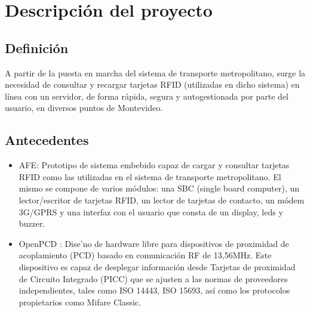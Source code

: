 \chapter{Descripci\'on del proyecto}

\section{Definici\'on}

A partir de la puesta en marcha del sistema de transporte metropolitano, surge la necesidad de consultar y recargar tarjetas RFID (utilizadas en dicho sistema) en l\'inea con un servidor, de forma r\'apida, segura y autogestionada por parte del usuario, en diversos puntos de Montevideo.

\section{Antecedentes}

\begin{itemize}

\item AFE: Prototipo de sistema embebido capaz de cargar y consultar tarjetas RFID como las utilizadas en el sistema de transporte metropolitano. El mismo se compone de varios m\'odulos: una SBC (single board computer), un lector/escritor de tarjetas RFID, un lector de tarjetas de contacto, un m\'odem 3G/GPRS y una interfaz con el usuario que consta de un display, leds y buzzer.

\item OpenPCD \cite{OpenPCD}: Dise'no de hardware libre para dispositivos de proximidad de acoplamiento (PCD) basado en comunicaci\'on RF de 13,56MHz. Este dispositivo es capaz de desplegar informaci\'on desde Tarjetas de proximidad de Circuito Integrado (PICC) que se ajusten a las normas de proveedores independientes, tales como ISO 14443, ISO 15693, as\'i como los protocolos propietarios como Mifare Classic.

\end{itemize}
